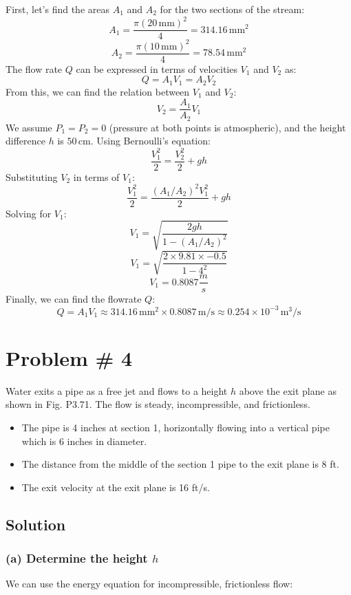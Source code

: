 \documentclass{article}
\begin{document}
First, let's find the areas \(A_1\) and \(A_2\) for the two sections of the stream:
\[
A_1 = \frac{\pi (20 \, \text{mm})^2}{4} = 314.16 \, \text{mm}^2
\]
\[
A_2 = \frac{\pi (10 \, \text{mm})^2}{4} = 78.54 \, \text{mm}^2
\]
The flow rate \(Q\) can be expressed in terms of velocities \(V_1\) and \(V_2\) as:
\[
Q = A_1 V_1 = A_2 V_2
\]
From this, we can find the relation between \(V_1\) and \(V_2\):
\[
V_2 = \frac{A_1}{A_2} V_1
\]
We assume \(P_1 = P_2 = 0\) (pressure at both points is atmospheric), and the height difference \(h\) is \(50 \, \text{cm}\). Using Bernoulli's equation:
\[
\frac{V_1^2}{2} = \frac{V_2^2}{2} + gh
\]
Substituting \(V_2\) in terms of \(V_1\):
\[
\frac{V_1^2}{2} = \frac{(A_1/A_2)^2 V_1^2}{2} + gh
\]
Solving for \(V_1\):
\[
V_1 = \sqrt{\frac{2gh}{1-(A_1/A_2)^2}}
\]
\[
V_1 = \sqrt{\frac{2\times9.81\times-0.5}{1-4^2}}
\]
\[
V_1 = 0.8087 \frac{m}{s}
\]
Finally, we can find the flowrate \(Q\):
\[
Q = A_1 V_1 \approx 314.16 \, \text{mm}^2 \times 0.8087 \, \text{m/s} \approx 0.254 \times 10^{-3} \, \text{m}^3/\text{s}
\]





\newpage

\section*{Problem \# 4}
Water exits a pipe as a free jet and flows to a height \( h \) above the exit plane as shown in Fig. P3.71. The flow is steady, incompressible, and frictionless.
\begin{itemize}
    \item The pipe is 4 inches at section 1, horizontally flowing into a vertical pipe which is 6 inches in diameter.
    \item The distance from the middle of the section 1 pipe to the exit plane is 8 ft.
    \item The exit velocity at the exit plane is 16 ft/s.
\end{itemize}

\subsection*{Solution}

\subsubsection*{(a) Determine the height \( h \)}
We can use the energy equation for incompressible, frictionless flow:
\end{document}
